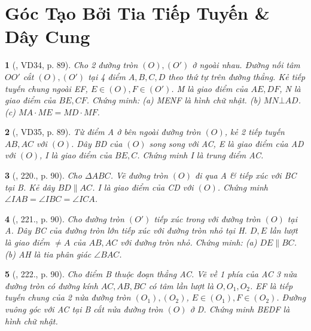 \documentclass{article}
\newtheorem{baitoan}{}
\begin{document}

\section{Góc Tạo Bởi Tia Tiếp Tuyến \& Dây Cung}

\begin{baitoan}[\cite{Binh_Toan_9_tap_2}, VD34, p. 89]
	Cho 2 đường tròn $(O),(O')$ ở ngoài nhau. Đường nối tâm $OO'$ cắt $(O),(O')$ tại 4 điểm $A,B,C,D$ theo thứ tự trên đường thẳng. Kẻ tiếp tuyến chung ngoài EF, $E\in(O),F\in(O')$. M là giao điểm của $AE,DF$, N là giao điểm của $BE,CF$. Chứng minh: (a) MENF là hình chữ nhật. (b) $MN\bot AD$. (c) $MA\cdot ME = MD\cdot MF$.
\end{baitoan}

\begin{baitoan}[\cite{Binh_Toan_9_tap_2}, VD35, p. 89]
	Từ điểm A ở bên ngoài đường tròn $(O)$, kẻ 2 tiếp tuyến $AB,AC$ với $(O)$. Dây BD của $(O)$ song song với AC, E là giao điểm của AD với $(O)$, I là giao điểm của $BE,C$. Chứng minh I là trung điểm AC.
\end{baitoan}

\begin{baitoan}[\cite{Binh_Toan_9_tap_2}, 220., p. 90]
	Cho $\Delta ABC$. Vẽ đường tròn $(O)$ đi qua A \& tiếp xúc với BC tại B. Kẻ dây $BD\parallel AC$. I là giao điểm của CD với $(O)$. Chứng minh $\angle{IAB} = \angle{IBC} = \angle{ICA}$.
\end{baitoan}

\begin{baitoan}[\cite{Binh_Toan_9_tap_2}, 221., p. 90]
	Cho đường tròn $(O')$ tiếp xúc trong với đường tròn $(O)$ tại A. Dây BC của đường tròn lớn tiếp xúc với đường tròn nhỏ tại H. $D,E$ lần lượt là giao điểm $\ne A$ của $AB,AC$ với đường tròn nhỏ. Chứng minh: (a) $DE\parallel BC$. (b) AH là tia phân giác $\angle{BAC}$.
\end{baitoan}

\begin{baitoan}[\cite{Binh_Toan_9_tap_2}, 222., p. 90]
	Cho điểm B thuộc đoạn thẳng AC. Vẽ về 1 phía của AC 3 nửa đường tròn có đường kính $AC,AB,BC$ có tâm lần lượt là $O,O_1,O_2$. EF là tiếp tuyến chung của 2 nửa đường tròn $(O_1),(O_2)$, $E\in(O_1),F\in(O_2)$. Đường vuông góc với AC tại B cắt nửa đường tròn $(O)$ ở D. Chứng minh BEDF là hình chữ nhật.
\end{baitoan}
\end{document}

